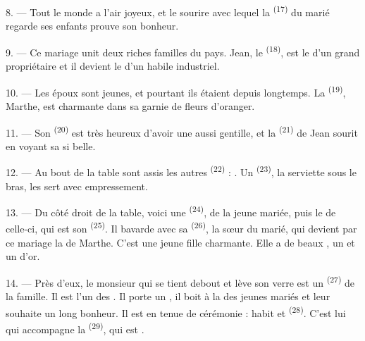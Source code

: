 \VUsaut{3.0mm}

8. --- Tout le monde a l'air joyeux, et le sourire avec lequel la
 \textsuperscript{(17)} du marié regarde ses enfants prouve son
bonheur.

9. --- Ce mariage unit deux riches familles du pays. Jean, le 
\textsuperscript{(18)}, est le  d'un grand propriétaire et il
devient le  d'un habile industriel.

10. --- Les époux sont jeunes, et pourtant ils étaient  depuis
longtemps. La  \textsuperscript{(19)}, Marthe, est
charmante dans sa  garnie de fleurs d'oranger.

11. --- Son  \textsuperscript{(20)} est très heureux d'avoir
une  aussi gentille, et la 
\textsuperscript{(21)} de Jean sourit en voyant sa  si belle.

12. --- Au bout de la table sont assis les autres 
\textsuperscript{(22)} : . Un
 \textsuperscript{(23)}, la serviette sous le bras, les
sert avec empressement.

\VUsaut{3.0mm}

13. --- Du côté droit de la table, voici une 
\textsuperscript{(24)},  de la jeune mariée, puis le
 de celle-ci, qui est son 
\textsuperscript{(25)}. Il bavarde avec sa 
\textsuperscript{(26)}, la sœur du marié, qui devient par ce mariage la
 de Marthe. C'est une jeune fille charmante. Elle a de beaux
, un  et un  d'or.

14. --- Près d'eux, le monsieur qui se tient debout et lève son verre est un
 \textsuperscript{(27)} de la famille. Il est l'un des
. Il porte un , il boit à la
 des jeunes mariés et leur souhaite un long bonheur. Il est en
tenue de cérémonie : habit et  \textsuperscript{(28)}.
C'est lui qui accompagne la  \textsuperscript{(29)}, qui est
.

